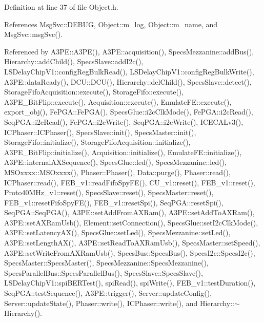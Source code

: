 Definition at line 37 of file Object.\+h.



References Msg\+Svc\+::\+D\+E\+B\+UG, Object\+::m\+\_\+log, Object\+::m\+\_\+name, and Msg\+Svc\+::msg\+Svc().



Referenced by A3\+P\+E\+::\+A3\+P\+E(), A3\+P\+E\+::acquisition(), Specs\+Mezzanine\+::add\+Bus(), Hierarchy\+::add\+Child(), Specs\+Slave\+::add\+I2c(), L\+S\+Delay\+Chip\+V1\+::config\+Reg\+Bulk\+Read(), L\+S\+Delay\+Chip\+V1\+::config\+Reg\+Bulk\+Write(), A3\+P\+E\+::data\+Ready(), D\+C\+U\+::\+D\+C\+U(), Hierarchy\+::del\+Child(), Specs\+Slave\+::detect(), Storage\+Fifo\+Acquisition\+::execute(), Storage\+Fifo\+::execute(), A3\+P\+E\+\_\+\+Bit\+Flip\+::execute(), Acquisition\+::execute(), Emulate\+F\+E\+::execute(), export\+\_\+obj(), Fe\+P\+G\+A\+::\+Fe\+P\+G\+A(), Specs\+Glue\+::i2c\+Clk\+Mode(), Fe\+P\+G\+A\+::i2c\+Read(), Seq\+P\+G\+A\+::i2c\+Read(), Fe\+P\+G\+A\+::i2c\+Write(), Seq\+P\+G\+A\+::i2c\+Write(), I\+C\+E\+C\+A\+Lv3(), I\+C\+Phaser\+::\+I\+C\+Phaser(), Specs\+Slave\+::init(), Specs\+Master\+::init(), Storage\+Fifo\+::initialize(), Storage\+Fifo\+Acquisition\+::initialize(), A3\+P\+E\+\_\+\+Bit\+Flip\+::initialize(), Acquisition\+::initialize(), Emulate\+F\+E\+::initialize(), A3\+P\+E\+::internal\+A\+X\+Sequence(), Specs\+Glue\+::led(), Specs\+Mezzanine\+::led(), M\+S\+Oxxxx\+::\+M\+S\+Oxxxx(), Phaser\+::\+Phaser(), Data\+::purge(), Phaser\+::read(), I\+C\+Phaser\+::read(), F\+E\+B\+\_\+v1\+::read\+Fifo\+Spy\+F\+E(), C\+U\+\_\+v1\+::reset(), F\+E\+B\+\_\+v1\+::reset(), Proto40\+M\+Hz\+\_\+v1\+::reset(), Specs\+Slave\+::reset(), Specs\+Master\+::reset(), F\+E\+B\+\_\+v1\+::reset\+Fifo\+Spy\+F\+E(), F\+E\+B\+\_\+v1\+::reset\+Spi(), Seq\+P\+G\+A\+::reset\+Spi(), Seq\+P\+G\+A\+::\+Seq\+P\+G\+A(), A3\+P\+E\+::set\+Add\+From\+A\+X\+Ram(), A3\+P\+E\+::set\+Add\+To\+A\+X\+Ram(), A3\+P\+E\+::set\+A\+X\+Ram\+Usb(), Element\+::set\+Connection(), Specs\+Glue\+::set\+I2c\+Clk\+Mode(), A3\+P\+E\+::set\+Latency\+A\+X(), Specs\+Glue\+::set\+Led(), Specs\+Mezzanine\+::set\+Led(), A3\+P\+E\+::set\+Length\+A\+X(), A3\+P\+E\+::set\+Read\+To\+A\+X\+Ram\+Usb(), Specs\+Master\+::set\+Speed(), A3\+P\+E\+::set\+Write\+From\+A\+X\+Ram\+Usb(), Specs\+Bus\+::\+Specs\+Bus(), Specs\+I2c\+::\+Specs\+I2c(), Specs\+Master\+::\+Specs\+Master(), Specs\+Mezzanine\+::\+Specs\+Mezzanine(), Specs\+Parallel\+Bus\+::\+Specs\+Parallel\+Bus(), Specs\+Slave\+::\+Specs\+Slave(), L\+S\+Delay\+Chip\+V1\+::spi\+B\+E\+R\+Test(), spi\+Read(), spi\+Write(), F\+E\+B\+\_\+v1\+::test\+Duration(), Seq\+P\+G\+A\+::test\+Sequence(), A3\+P\+E\+::trigger(), Server\+::update\+Config(), Server\+::update\+State(), Phaser\+::write(), I\+C\+Phaser\+::write(), and Hierarchy\+::$\sim$\+Hierarchy().


